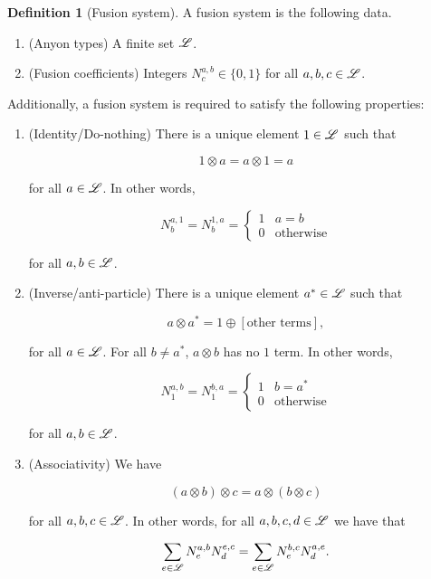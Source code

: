 \documentclass{article}
\theoremstyle{definition}
\newtheorem*{definition}{Definition}
\numberwithin{figure}{section}
\begin{document}
\begin{definition}[Fusion system] A fusion system is the following data.

\begin{enumerate}
\item (Anyon types) A finite set $\mathscr{L}$.
\item (Fusion coefficients) Integers $N_{c}^{a,b}\in\{0,1\}$ for all $a,b,c\in \mathscr{L}$.
\end{enumerate}

Additionally, a fusion system is required to satisfy the following properties:

\begin{enumerate}
\item (Identity/Do-nothing) There is a unique element $1\in \mathscr{L}$ such that

$$1\otimes a=a\otimes 1=a$$

for all $a\in \mathscr{L}$. In other words,

$$N^{a,1}_{b}=N^{1,a}_{b}=\begin{cases}1 & a=b \\ 0 & \text{otherwise}\end{cases}$$

for all $a,b\in \mathscr{L}$.

\item (Inverse/anti-particle) There is a unique element $a^*\in \mathscr{L}$ such that

$$a\otimes a^*=1\oplus [\text{other terms}],$$

for all $a\in \mathscr{L}$. For all $b\neq a^*$, $a\otimes b$ has no $1$ term. In other words,

$$N^{a,b}_{1}=N^{b,a}_{1}=\begin{cases} 1 & b=a^* \\ 0 & \text{otherwise}\end{cases}$$

for all $a, b\in \mathscr{L}$.

\item (Associativity) We have

$$(a\otimes b)\otimes c=a\otimes (b\otimes c)$$

for all $a,b,c\in \mathscr{L}$. In other words, for all $a,b,c,d\in \mathscr{L}$ we have that

$$\sum_{e\in \mathscr{L}}N_e^{a,b}N_{d}^{e,c}=\sum_{e\in \mathscr{L}}N_{e}^{b,c}N_d^{a,e}.$$
\end{enumerate}

\raggedleft\qedsymbol{}
\end{definition}
\end{document}
